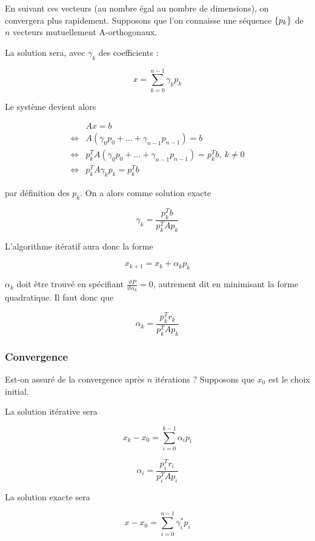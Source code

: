 	En suivant ces vecteurs (au nombre égal au nombre de dimensions), on convergera plus rapidement. Supposons que l'on connaisse une séquence $\lbrace p_k \rbrace$ de $n$ vecteurs mutuellement A-orthogonaux.
	
	La solution sera, avec $\gamma_k$ des coefficients :
	
	$$x = \sum_{k = 0}^{n - 1} \gamma_k p_k$$
	
	Le système devient alors
	
	
	\begin{eqnarray}
	& Ax = b \\
	\Leftrightarrow & A(\gamma_0 p_0 + \dots + \gamma_{n - 1}p_{n - 1}) = b \\
	\Leftrightarrow & p_k^T A (\gamma_0 p_0 + \dots + \gamma_{n - 1} p_{n - 1}) = p_k^Tb, \: k \neq 0 \\
	\Leftrightarrow & p_k^TA\gamma_kp_k = p_k^Tb
	\end{eqnarray}
	
	par définition des $p_k$. On a alors comme solution exacte
	
	$$\gamma_k = \frac{p_k^Tb}{p_k^TAp_k}$$
	
	L'algorithme itératif aura donc la forme 
	
	$$x_{k + 1} = x_k + \alpha_k p_k$$
	
	$\alpha_k$ doit être trouvé en spécifiant $\frac{\vartheta P}{\vartheta \alpha_k} = 0$, autrement dit en minimisant la forme quadratique. Il faut donc que 
	
	$$\alpha_k = \frac{p_k^Tr_k}{p_k^TAp_k}$$
	
		\subsubsection{Convergence}
		
		Est-on assuré de la convergence après $n$ itérations ? Supposons que $x_0$ est le choix initial.
		
		La solution itérative sera
		
		$$x_k - x_0 = \sum_{i = 0}^{k - 1}\alpha_i p_i$$
		
		$$\alpha_i = \frac{p_i^Tr_i}{p_i^TAp_i}$$
		
		La solution exacte sera
		
		$$x - x_0 = \sum_{i = 0}^{n - 1} \gamma_i^*p_i$$
		
